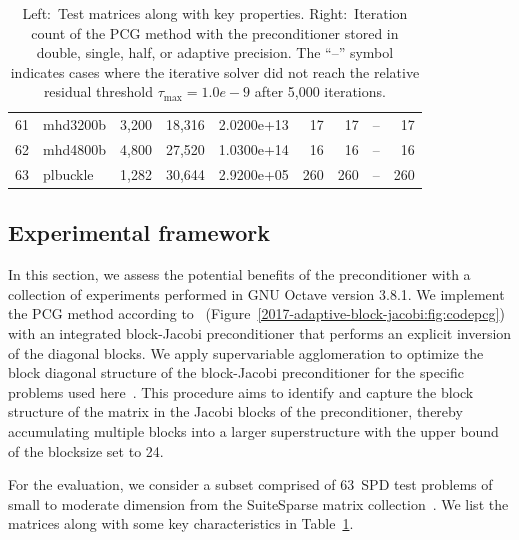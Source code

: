 \begin{table}
\begin{center}
\begin{tabular}{rlrrr||rrrr}
 61 &   mhd3200b & 3,200 &    18,316 & 2.0200e+13 &  17 &   17 &  -- &   17 \\
 62 &   mhd4800b & 4,800 &    27,520 & 1.0300e+14 &  16 &   16 &  -- &   16 \\
 63 &   plbuckle & 1,282 &    30,644 & 2.9200e+05 & 260 &  260 &  -- &  260 \\
 \hline
 \hline
\end{tabular}
\end{center}
\caption{Left:~Test matrices along with key properties. Right:~Iteration count 
of 
the PCG method with the preconditioner stored in double, single, half, or 
adaptive precision.
The ``--'' symbol indicates cases where the iterative solver did not reach the 
relative residual threshold $\tau_{\max}=1.0e-9$ after 5,000 iterations.}
\label{2017-adaptive-block-jacobi:tab:matrices}
\end{table}



\subsection{Experimental framework}

In this section, we assess the potential benefits of the \apbj preconditioner
with a collection of experiments performed in GNU Octave version 3.8.1.
We implement the PCG method according
to~\cite{doi:10.1137/S1064827597323415} (Figure~\ref{2017-adaptive-block-jacobi:fig:codepcg}) with an
integrated block-Jacobi preconditioner that performs an explicit inversion of
the diagonal blocks. We apply supervariable agglomeration to optimize the block
diagonal structure of the block-Jacobi preconditioner for the specific
problems used here~\cite{jenniferscott}. This procedure aims to identify and 
capture the
block structure of the matrix in the Jacobi blocks of the preconditioner, 
thereby
accumulating multiple blocks into a larger superstructure with the upper bound
of the blocksize set to 24.

For the evaluation, we consider a subset comprised of 63~SPD test problems 
of small to moderate dimension from the SuiteSparse matrix 
collection~\cite{ufmc}. 
We list the matrices along with some key characteristics in 
Table~\ref{2017-adaptive-block-jacobi:tab:matrices}.


